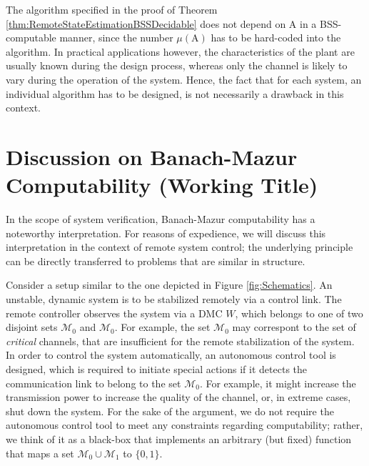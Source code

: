 \documentclass[conference]{IEEEtran}
\def\M{{\mathcal M}}
\def\mA{\bm{\mathrm{A}}}
\begin{document}
	The algorithm specified in the proof of Theorem \ref{thm:RemoteStateEstimationBSSDecidable} does not depend on \(\mA\) in a BSS-computable manner,
	since the number \(\mu(\mA)\) has to be hard-coded into the algorithm. In practical applications however, the characteristics of the plant
	are usually known during the design process, whereas only the channel is likely to vary during the operation
	of the system. Hence, the fact that for each system, an individual algorithm has to be designed, is not necessarily a drawback in this context.
	
\section{Discussion on Banach-Mazur Computability (Working Title)}
	In the scope of system verification, Banach-Mazur computability has a noteworthy interpretation.
	For reasons of expedience, we will discuss this interpretation in the context of remote system control; the underlying principle can be 
	directly transferred to problems that are similar in structure.
	
	Consider a setup similar to the one depicted in Figure \ref{fig:Schematics}. An unstable, dynamic system is to be stabilized remotely via a control link.
	The remote controller observes the system via a DMC \(W\), which belongs to one of two disjoint sets \(\M_0\) and \(\M_0\). For example, the set \(\M_0\) may
	correspont to the set of \emph{critical} channels, that are insufficient for the remote stabilization of the system. In order to control the system automatically,
	an autonomous control tool is designed, which is required to initiate special actions if it detects the communication link to belong to the set \(\M_0\). For example,
	it might increase the transmission power to increase the quality of the channel, or, in extreme cases, shut down the system. For the sake of the argument, we
	do not require the autonomous control tool to meet any constraints regarding computability; rather, we think of it as a black-box that implements an arbitrary
	(but fixed) function that maps a set \(\M_0\cup \M_1\) to \(\{0,1\}\).
	
\end{document}
